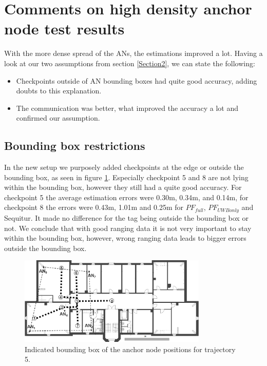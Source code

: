 \section{Comments on high density anchor node test results}
\label{Section4}
With the more dense spread of the ANs, the estimations improved a lot. Having a look at our two assumptions from section \ref{Section2}, we can state the following:

\begin{itemize}
\item Checkpoints outside of AN bounding boxes had quite good accuracy, adding doubts to this explanation.
\item The communication was better, what improved the accuracy a lot and confirmed our assumption.
\end{itemize}

\subsection{Bounding box restrictions}
In the new setup we purposely added checkpoints at the edge or outside the bounding box, as seen in figure \ref{fig:trajectory5_boundingBox}. Especially checkpoint 5 and 8 are not lying within the bounding box, however they still had a quite good accuracy. For checkpoint 5 the average estimation errors were 0.30m, 	0.34m, and 0.14m, for checkpoint 8 the errors were 0.43m,	1.01m and 0.25m for $PF_{full}$, $PF_{UWBonly}$ and Sequitur. It made no difference for the tag being outside the bounding box or not. We conclude that with good ranging data it is not very important to stay within the bounding box, however, wrong ranging data leads to bigger errors outside the bounding box.

\begin{figure}[th]
\centering
\includegraphics[width=0.8\textwidth]{Figures/trajectory5_boundingBox}
\decoRule
\caption[Trajectory 5 with bounding box]{Indicated bounding box of the anchor node positions for trajectory 5.}
\label{fig:trajectory5_boundingBox}
\end{figure}

